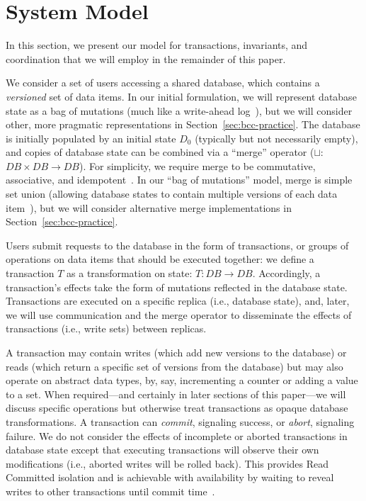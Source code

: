 
\section{System Model}
\label{sec:model}

In this section, we present our model for transactions, invariants,
and coordination that we will employ in the remainder of this paper.

 We consider a set of users accessing a shared
database, which contains a \textit{versioned} set of data items. In
our initial formulation, we will represent database state as a bag of
mutations (much like a write-ahead log~\cite{bernstein-book}), but we will
consider other, more pragmatic representations in
Section~\ref{sec:bcc-practice}. The database is initially populated by
an initial state $D_0$ (typically but not necessarily empty), and
copies of database state can be combined via a ``merge'' operator
($\sqcup$: $DB \times DB \rightarrow DB$).  For simplicity, we require
merge to be commutative, associative, and
idempotent~\cite{calm,crdt}. In our ``bag of mutations'' model, merge
is simple set union (allowing database states to contain multiple
versions of each data item~\cite{adya-isolation}), but we will
consider alternative merge implementations in
Section~\ref{sec:bcc-practice}.

 Users submit requests to the database in the
form of transactions, or groups of operations on data items that
should be executed together: we define a transaction $T$ as a
transformation on state: $T: DB \rightarrow DB$. Accordingly, a
transaction's effects take the form of mutations reflected in the
database state. Transactions are executed on a specific replica (i.e.,
database state), and, later, we will use communication and the merge
operator to disseminate the effects of transactions (i.e., write sets)
between replicas.

A transaction may contain writes (which add new versions to the
database) or reads (which return a specific set of versions from the
database) but may also operate on abstract data types, by, say,
incrementing a counter or adding a value to a set. When required---and
certainly in later sections of this paper---we will discuss specific
operations but otherwise treat transactions as opaque database
transformations. A transaction can \textit{commit}, signaling success,
or \textit{abort}, signaling failure. We do not consider the effects
of incomplete or aborted transactions in database state except that
executing transactions will observe their own modifications (i.e.,
aborted writes will be rolled back). This provides Read Committed
isolation and is achievable with availability by waiting to reveal
writes to other transactions until commit
time~\cite{hat-vldb,spanner}.

